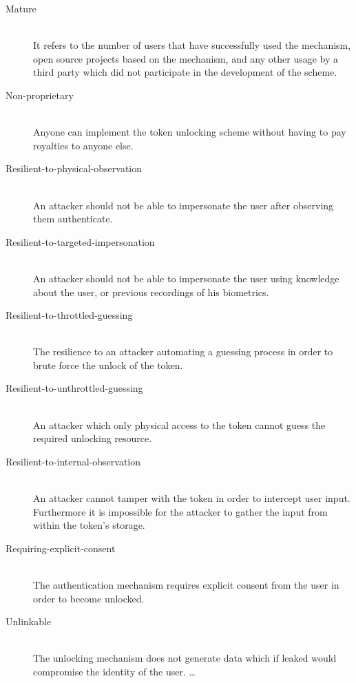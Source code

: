 \begin{description}
  \item[Mature] \hfill \\
  It refers to the number of users that have successfully used the mechanism, open source projects based on the mechanism, and any other usage by a third party which did not participate in the development of the scheme.
  
  \item[Non-proprietary] \hfill \\
  Anyone can implement the token unlocking scheme without having to pay royalties to anyone else.
  
  \item[Resilient-to-physical-observation] \hfill \\
  An attacker should not be able to impersonate the user after observing them authenticate.
  
  \item[Resilient-to-targeted-impersonation] \hfill \\
  An attacker should not be able to impersonate the user using knowledge about the user, or previous recordings of his biometrics.
  
  \item[Resilient-to-throttled-guessing] \hfill \\
  The resilience to an attacker automating a guessing process in order to brute force the unlock of the token.
  
  \item[Resilient-to-unthrottled-guessing] \hfill \\
  An attacker which only physical access to the token cannot guess the required unlocking resource.
  
  \item[Resilient-to-internal-observation] \hfill \\
  An attacker cannot tamper with the token in order to intercept user input. Furthermore it is impossible for the attacker to gather the input from within the token's storage.
  
  \item[Requiring-explicit-consent] \hfill \\
  The authentication mechanism requires explicit consent from the user in order to become unlocked.
  
  \item[Unlinkable] \hfill \\
  The unlocking mechanism does not generate data which if leaked would compromise the identity of the user. \ldots
  
\end{description}

